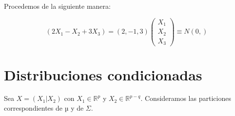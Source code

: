 \documentclass[nochap]{apuntes}
\begin{document}
Procedemos de la siguiente manera:

\[
(2X_1-X_2+3X_3)=(2,-1,3)\left(
\begin{array}{c}
X_1\\
X_2\\
X_3
\end{array}
\right)\equiv
N\left( 0,  \right)
\]



\section{Distribuciones condicionadas}

\begin{prop}

Sea $X=(X_1|X_2)$ con $X_1∈ℝ^p$ y $X_2∈ℝ^{p-q}$. Consideramos las particiones correspondientes de $µ$ y de $\Sigma$.

\end{prop}
\end{document}
